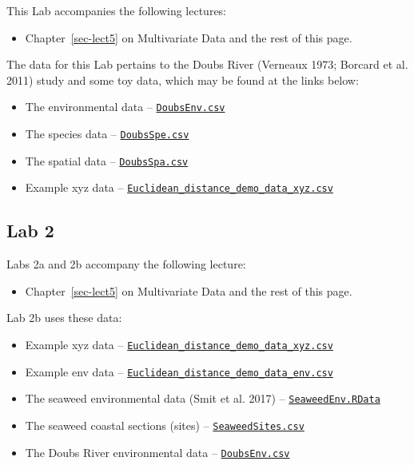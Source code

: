 \documentclass[
  10pt,
]{book}
\providecommand{\tightlist}{%
  \setlength{\itemsep}{0pt}\setlength{\parskip}{0pt}}
\let\oldtexttt\texttt
\renewcommand{\texttt}[1]{\oldtexttt{\small #1}}
\begin{document}
This Lab accompanies the following lectures:

\begin{itemize}
\tightlist
\item
  Chapter~\ref{sec-lect5} on Multivariate Data and the rest of this
  page.
\end{itemize}

The data for this Lab pertains to the Doubs River (Verneaux 1973;
Borcard et al. 2011) study and some toy data, which may be found at the
links below:

\begin{itemize}
\tightlist
\item
  The environmental data --
  \href{../data/DoubsEnv.csv}{\texttt{DoubsEnv.csv}}
\item
  The species data -- \href{../data/DoubsSpe.csv}{\texttt{DoubsSpe.csv}}
\item
  The spatial data -- \href{../data/DoubsSpa.csv}{\texttt{DoubsSpa.csv}}
\item
  Example xyz data --
  \href{../data/Euclidean_distance_demo_data_xyz.csv}{\texttt{Euclidean\_distance\_demo\_data\_xyz.csv}}
\end{itemize}

\subsection{Lab 2}\label{lab-2}

Labs 2a and 2b accompany the following lecture:

\begin{itemize}
\tightlist
\item
  Chapter~\ref{sec-lect5} on Multivariate Data and the rest of this
  page.
\end{itemize}

Lab 2b uses these data:

\begin{itemize}
\tightlist
\item
  Example xyz data --
  \href{../data/Euclidean_distance_demo_data_xyz.csv}{\texttt{Euclidean\_distance\_demo\_data\_xyz.csv}}
\item
  Example env data --
  \href{../data/Euclidean_distance_demo_data_env.csv}{\texttt{Euclidean\_distance\_demo\_data\_env.csv}}
\item
  The seaweed environmental data (Smit et al. 2017) --
  \href{../data/seaweed/SeaweedEnv.RData}{\texttt{SeaweedEnv.RData}}
\item
  The seaweed coastal sections (sites) --
  \href{../data/seaweed/SeaweedSites.csv}{\texttt{SeaweedSites.csv}}
\item
  The Doubs River environmental data --
  \href{../data/DoubsEnv.csv}{\texttt{DoubsEnv.csv}}
\end{itemize}
\end{document}
